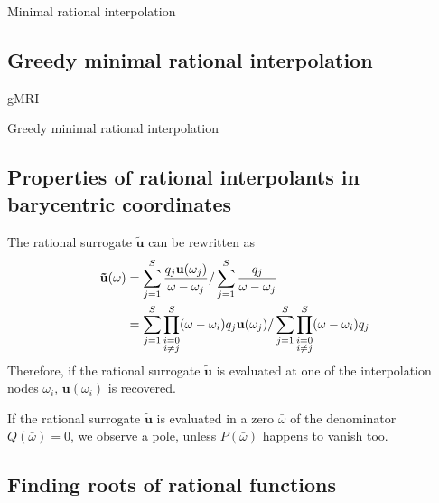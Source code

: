 \documentclass[11pt, a4paper]{article}
\begin{document}
\citep{greedyMRI}

\begin{algorithm}
    \caption{Minimal rational interpolation} \label{alg:MRI}
    
\end{algorithm}

\subsection{Greedy minimal rational interpolation}
\label{subsec:gMRI}

\acrfull{gMRI}

\citep{shortMRI}

\begin{algorithm}
    \caption{Greedy minimal rational interpolation} \label{alg:gMRI}
    
\end{algorithm}

\subsection{Properties of rational interpolants in barycentric coordinates}
\label{subsec:properties}

The rational surrogate $\mathbf{\tilde{u}}$ can be rewritten as 
\begin{align}
    \mathbf{\tilde{u}}(\omega)
    &= \sum_{j=1}^S \frac{q_j \mathbf{u}(\omega_j)}{\omega - \omega_j}
    / \sum_{j=1}^S \frac{q_j}{\omega - \omega_j} \notag \\
    &= \sum_{j=1}^S \prod_{\substack{i=0 \\ i \neq j}}^S (\omega - \omega_i) q_j \mathbf{u}(\omega_j)
    / \sum_{j=1}^S \prod_{\substack{i=0 \\ i \neq j}}^S (\omega - \omega_i) q_j
\end{align}
Therefore, if the rational surrogate $\mathbf{\tilde{u}}$ is evaluated at one of the
interpolation nodes $\omega_i$, $\mathbf{u}(\omega_i)$ is recovered.

If the rational surrogate $\mathbf{\tilde{u}}$ is evaluated in a zero
$\bar{\omega}$ of the denominator $Q(\bar{\omega}) = 0$, we observe a pole,
unless $P(\bar{\omega})$ happens to vanish too.

\subsection{Finding roots of rational functions}
\label{subsec:roots}
\end{document}
